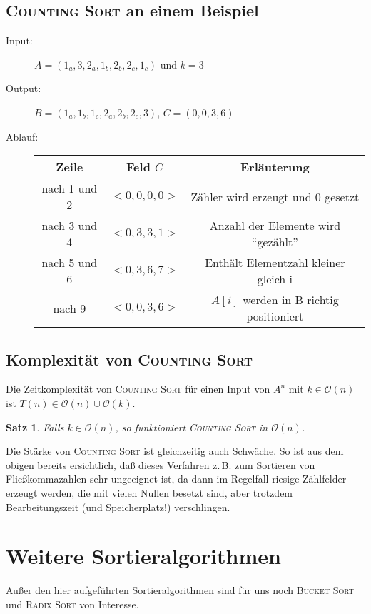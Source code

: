\documentclass[ngerman,draft,parskip=half*,twoside]{scrreprt}
\theoremstyle{break}
\newtheorem{satz}{Satz}[chapter]
\theoremstyle{nonumberbreak}
\newcommand*{\OO}{\mathcal{O}}      %
\begin{document}
  \subsection{\textsc{Counting Sort} an einem Beispiel}

  \begin{description}
    \item[Input:] $A = ( 1_a , 3 , 2_a , 1_b , 2_b , 2_c , 1_c )$ und $k = 3$
    \item[Output:] $B = ( 1_a , 1_b , 1_c , 2_a , 2_b , 2_c , 3 )$, $C = ( 0, 0, 3, 6 )$
    \item[Ablauf:]
    \begin{tabular}[t]{*{3}{c}}
      Zeile & Feld $C$ & Erläuterung\\
      \hline
      nach 1 und 2 & $< 0, 0, 0, 0 >$ & Zähler wird erzeugt und 0 gesetzt\\
      nach 3 und 4 & $< 0, 3, 3, 1>$   & Anzahl der Elemente wird ``gezählt''\\
      nach 5 und 6 & $< 0, 3, 6, 7>$   & Enthält Elementzahl kleiner gleich i\\
      nach 9       & $< 0, 0, 3, 6>$   & $A[ i ]$ werden in B richtig positioniert\\
    \end{tabular}
    
    
  \end{description}

  \subsection{Komplexität von \textsc{Counting Sort}}
   Die Zeitkomplexität von \textsc{Counting Sort} für einen Input von $A^n$ mit 
   $k\in\OO(n)$ ist $T(n)\in\OO(n)\cup\OO(k)$.
  \begin{satz}
   Falls $k \in  \OO( n )$, so funktioniert \textsc{Counting Sort} in $\OO(n)$.
  \end{satz}

Die Stärke von \textsc{Counting Sort} ist gleichzeitig auch Schwäche. So ist aus dem obigen bereits ersichtlich, daß dieses Verfahren
z.\,B. zum Sortieren von Fließkommazahlen sehr ungeeignet ist, da dann im Regelfall riesige Zählfelder erzeugt werden, die mit vielen
Nullen besetzt sind, aber trotzdem Bearbeitungszeit (und Speicherplatz!) verschlingen.

\section{Weitere Sortieralgorithmen}
  Außer den hier aufgeführten Sortieralgorithmen sind für uns noch \textsc{Bucket Sort} und
  \textsc{Radix Sort} von Interesse.
\end{document}
